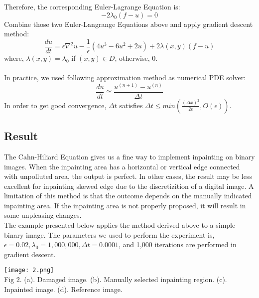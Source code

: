 \documentclass[a4paper]{article}
\begin{document}
\begin{spacing}{1.4}
Therefore, the corresponding Euler-Lagrange Equation is:\\
$$-2\lambda_0(f-u) = 0$$
Combine those two Euler-Langrange Equations above and apply gradient descent method:
$$\frac{du}{dt} = \epsilon \nabla^2 u-\frac{1}{\epsilon}(4u^3-6u^2+2u) +2\lambda(x, y)(f-u)$$
where, $\lambda(x, y) = \lambda_0$ if $(x, y) \in D$, otherwise, $0$.\\
~\\
In practice, we used following approximation method as numerical PDE solver:\\
$$ \frac{du}{dt} \simeq \frac{u^{(n+1)}-u^{(n)}}{\Delta t}$$
In order to get good convergence, $\Delta t$ satisfies $\Delta t \leq min(\frac{(\Delta x)^2}{2\epsilon}, O(\epsilon))$.\\
\subsection{Result}
The Cahn-Hiliard Equation gives us a fine way to implement inpainting on binary images. When the inpainting area has a horizontal or vertical edge connected with unpolluted area, the output is perfect. In other cases, the result may be less excellent for inpainting skewed edge due to the discretizition of a digital image. A limitation of this method is that the outcome depends on the manually indicated inpainting area. If the inpainting area is not properly proposed, it will result in some unpleasing changes. 
\\The example presented below applies the method derived above to a simple binary image. The parameters we used to perform the experiment is, $\epsilon = 0.02, \lambda_0 = 1,000,000, \Delta t = 0.0001$, and 1,000 iterations are performed in gradient descent.\\
\begin{center}
\texttt{[image: 2.png]}\\
\scriptsize
Fig 2. (a). Damaged image. (b). Manually selected inpainting region. (c). Inpainted image. (d). Reference image.
\end{center}


\end{spacing}
\end{document}
